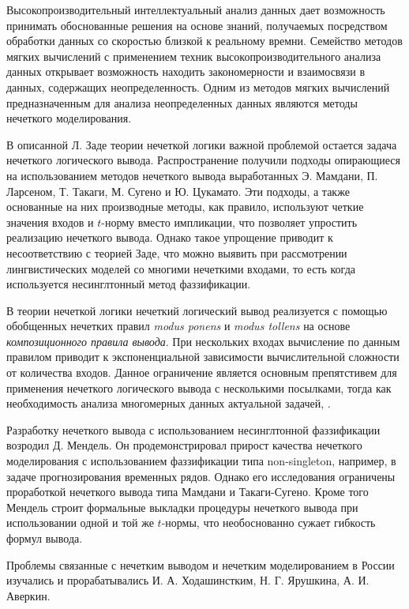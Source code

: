 
{\actuality} Высокопроизводительный интеллектуальный анализ данных дает возможность принимать обоснованные решения на основе знаний, получаемых посредством обработки данных со скоростью близкой к реальному времни. Семейство методов мягких вычислений с применением техник высокопроизводительного анализа данных открывает возможность находить закономерности и взаимосвязи в данных, содержащих неопределенность. Одним из методов мягких вычислений предназначенным для анализа неопределенных данных являются методы нечеткого моделирования.

В описанной Л. Заде теории нечеткой логики важной проблемой остается задача нечеткого логического вывода. Распространение получили подходы опирающиеся на использованием методов нечеткого вывода выработанных Э. Мамдани, П. Ларсеном, Т. Такаги, М. Сугено и Ю. Цукамато. Эти подходы, а также основанные на них производные методы, как правило, используют четкие значения входов и $t$-норму вместо импликации, что позволяет упростить реализацию нечеткого вывода. Однако такое упрощение приводит к несоответствию с теорией Заде, что можно выявить при рассмотрении лингвистических моделей со многими нечеткими входами, то есть когда используется несинглтонный метод фаззификации.

В теории нечеткой логики нечеткий логический вывод реализуется с помощью обобщенных нечетких правил \textit{modus ponens} и \textit{modus tollens} на основе \textit{композиционного правила вывода}. При нескольких входах вычисление по данным правилом приводит к экспоненциальной зависимости вычислительной сложности от количества входов. Данное ограничение является основным препятстивем для применения нечеткого логического вывода с несколькими посылками, тогда как необходимость анализа многомерных данных  актуальной задачей, .

Разработку нечеткого вывода с использованием несинглтонной фаззификации возродил Д. Мендель. Он продемонстрировал прирост качества нечеткого моделирования с использованием фаззификации типа non-singleton, например, в задаче прогнозирования временных рядов. Однако его исследования ограничены проработкой нечеткого вывода типа Мамдани и Такаги-Сугено. Кроме того Мендель строит формальные выкладки процедуры нечеткого вывода при использовании одной и той же $t$-нормы, что необоснованно сужает гибкость формул вывода.

Проблемы связанные с нечетким выводом и нечетким моделированием в России изучались и прорабатывались И. А. Ходашинстким, Н. Г. Ярушкина, А. И. Аверкин.



